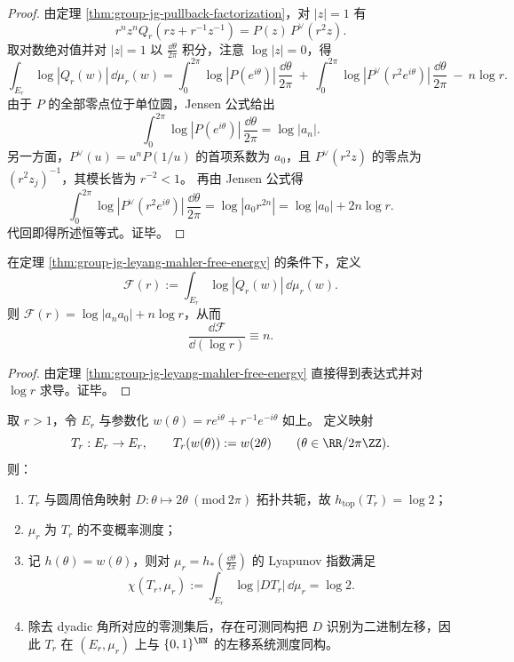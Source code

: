 \begin{proof}
由定理 \ref{thm:group-jg-pullback-factorization}，对 \(|z|=1\) 有
\[
r^n z^n Q_r\!\left(r z+r^{-1}z^{-1}\right)=P(z)\,P^{\vee}(r^2 z).
\]
取对数绝对值并对 \(|z|=1\) 以 \(\frac{\dd\theta}{2\pi}\) 积分，注意 \(\log|z|=0\)，得
\[
\int_{E_r}\log|Q_r(w)|\,\dd\mu_r(w)
=\int_{0}^{2\pi}\log|P(e^{i\theta})|\,\frac{\dd\theta}{2\pi}
\ +\ \int_{0}^{2\pi}\log|P^{\vee}(r^2 e^{i\theta})|\,\frac{\dd\theta}{2\pi}
\ -\ n\log r.
\]
由于 \(P\) 的全部零点位于单位圆，Jensen 公式给出
\[
\int_{0}^{2\pi}\log|P(e^{i\theta})|\,\frac{\dd\theta}{2\pi}=\log|a_n|.
\]
另一方面，\(P^\vee(u)=u^n P(1/u)\) 的首项系数为 \(a_0\)，且 \(P^\vee(r^2 z)\) 的零点为 \((r^2 z_j)^{-1}\)，其模长皆为 \(r^{-2}<1\)。
再由 Jensen 公式得
\[
\int_{0}^{2\pi}\log|P^{\vee}(r^2 e^{i\theta})|\,\frac{\dd\theta}{2\pi}
=\log|a_0 r^{2n}|=\log|a_0|+2n\log r.
\]
代回即得所述恒等式。证毕。
\end{proof}

\begin{corollary}[椭圆输运自由能的线性响应]\label{cor:group-jg-leyang-free-energy-linear-flux}
在定理 \ref{thm:group-jg-leyang-mahler-free-energy} 的条件下，定义
\[
\mathcal F(r):=\int_{E_r}\log|Q_r(w)|\,\dd\mu_r(w).
\]
则 \(\mathcal F(r)=\log|a_n a_0|+n\log r\)，从而
\[
\frac{\dd \mathcal F}{\dd(\log r)}\equiv n.
\]
\end{corollary}

\begin{proof}
由定理 \ref{thm:group-jg-leyang-mahler-free-energy} 直接得到表达式并对 \(\log r\) 求导。证毕。
\end{proof}

\begin{theorem}\label{thm:group-jg-leyang-ellipse-doubling-shift}
取 \(r>1\)，令 \(E_r\) 与参数化 \(w(\theta)=r e^{i\theta}+r^{-1}e^{-i\theta}\) 如上。
定义映射
\[
T_r:E_r\to E_r,\qquad T_r(w(\theta)):=w(2\theta)\qquad(\theta\in\RR/2\pi\ZZ).
\]
则：
\begin{enumerate}
  \item \(T_r\) 与圆周倍角映射 \(D:\theta\mapsto 2\theta\ (\mathrm{mod}\ 2\pi)\) 拓扑共轭，故 \(h_{\mathrm{top}}(T_r)=\log 2\)；
  \item \(\mu_r\) 为 \(T_r\) 的不变概率测度；
  \item 记 \(h(\theta)=w(\theta)\)，则对 \(\mu_r=h_\ast(\frac{\dd\theta}{2\pi})\) 的 Lyapunov 指数满足
  \[
  \chi(T_r,\mu_r):=\int_{E_r}\log|DT_r|\,\dd\mu_r=\log 2.
  \]
  \item 除去 dyadic 角所对应的零测集后，存在可测同构把 \(D\) 识别为二进制左移，因此 \(T_r\) 在 \((E_r,\mu_r)\) 上与 \(\{0,1\}^{\NN}\) 的左移系统测度同构。
\end{enumerate}
\end{theorem}

